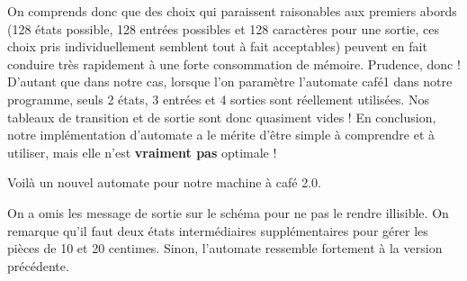 \documentclass[10pt]{article}
\begin{document}
\begin{enumerate}[label=\textbf{[\alph*]}]
  On comprends donc que des choix qui paraissent raisonables aux
  premiers abords (128 états possible, 128 entrées possibles et 128
  caractères pour une sortie, ces choix pris individuellement semblent
  tout à fait acceptables) peuvent en fait conduire très rapidement à
  une forte consommation de mémoire. Prudence, donc ! D'autant que
  dans notre cas, lorsque l'on paramètre l'automate café1 dans notre
  programme, seuls 2 états, 3 entrées et 4 sorties sont réellement
  utilisées. Nos tableaux de transition et de sortie sont donc
  quasiment vides ! En conclusion, notre implémentation d'automate a
  le mérite d'être simple à comprendre et à utiliser, mais elle n'est
  \textbf{vraiment pas} optimale !

\item Voilà un nouvel automate pour notre machine à café 2.0.

  \begin{center}
  \end{center}

  On a omis les message de sortie sur le schéma pour ne pas le rendre
  illisible. On remarque qu'il faut deux états intermédiaires
  supplémentaires pour gérer les pièces de 10 et 20 centimes. Sinon,
  l'automate ressemble fortement à la version précédente.
  \newpage


\end{enumerate}
\end{document}
